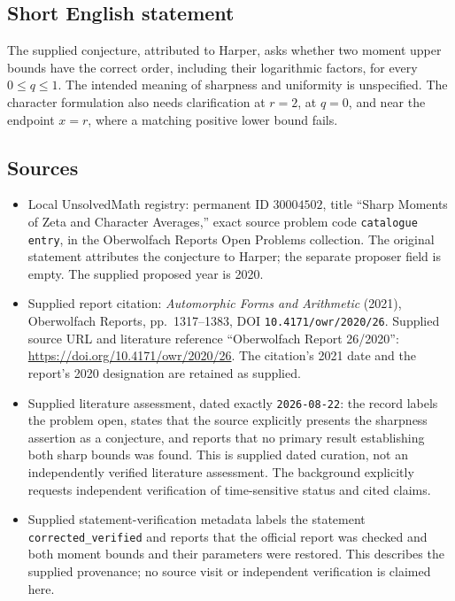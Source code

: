 \documentclass[11pt]{article}
\begin{document}
\subsection{Short English statement}
The supplied conjecture, attributed to Harper, asks whether two moment upper bounds have the correct order, including their logarithmic factors, for every \(0\leq q\leq1\). The intended meaning of sharpness and uniformity is unspecified. The character formulation also needs clarification at \(r=2\), at \(q=0\), and near the endpoint \(x=r\), where a matching positive lower bound fails.
\subsection{Sources}
\begin{itemize}
\item Local UnsolvedMath registry: permanent ID \(30004502\), title ``Sharp Moments of Zeta and Character Averages,'' exact source problem code \texttt{catalogue entry}, in the Oberwolfach Reports Open Problems collection. The original statement attributes the conjecture to Harper; the separate proposer field is empty. The supplied proposed year is 2020.
\item Supplied report citation: \emph{Automorphic Forms and Arithmetic} (2021), Oberwolfach Reports, pp.\ 1317--1383, DOI \texttt{10.4171/owr/2020/26}. Supplied source URL and literature reference ``Oberwolfach Report 26/2020'': \url{https://doi.org/10.4171/owr/2020/26}. The citation's 2021 date and the report's 2020 designation are retained as supplied.
\item Supplied literature assessment, dated exactly \texttt{2026-08-22}: the record labels the problem open, states that the source explicitly presents the sharpness assertion as a conjecture, and reports that no primary result establishing both sharp bounds was found. This is supplied dated curation, not an independently verified literature assessment. The background explicitly requests independent verification of time-sensitive status and cited claims.
\item Supplied statement-verification metadata labels the statement \texttt{corrected\_verified} and reports that the official report was checked and both moment bounds and their parameters were restored. This describes the supplied provenance; no source visit or independent verification is claimed here.
\end{itemize}
\end{document}
